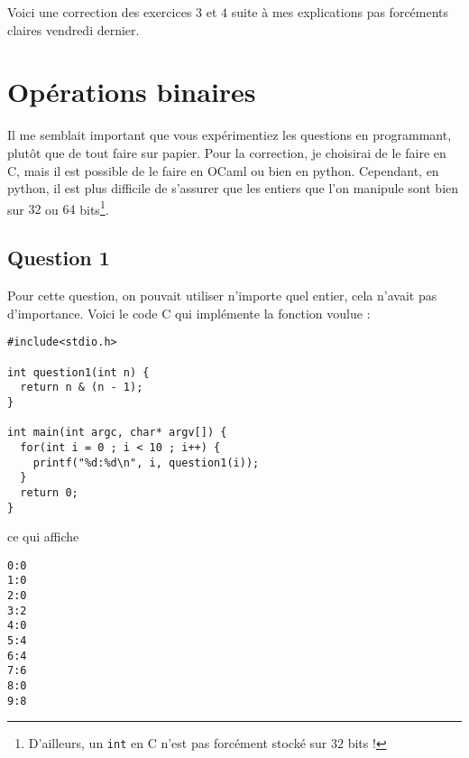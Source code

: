 \documentclass{article}
\begin{document}
Voici une correction des exercices \(3\) et \(4\) suite à mes explications pas forcéments claires vendredi dernier.

\section{Opérations binaires}

Il me semblait important que vous expérimentiez les questions en programmant, plutôt que de tout faire sur papier. Pour la correction, je choisirai de le faire en C, mais il est possible de le faire en OCaml ou bien en python. Cependant, en python, il est plus difficile de s'assurer que les entiers que l'on manipule sont bien sur \(32\) ou \(64\) bits\footnote{D'ailleurs, un \texttt{int} en C n'est pas forcément stocké sur \(32\) bits !}.

\subsection{Question 1}

Pour cette question, on pouvait utiliser n'importe quel entier, cela n'avait pas d'importance. Voici le code C qui implémente la fonction voulue :

\begin{verbatim}
#include<stdio.h>

int question1(int n) {
  return n & (n - 1);
}

int main(int argc, char* argv[]) {
  for(int i = 0 ; i < 10 ; i++) {
    printf("%d:%d\n", i, question1(i));
  }
  return 0;
}
\end{verbatim}

ce qui affiche

\begin{verbatim}
0:0
1:0
2:0
3:2
4:0
5:4
6:4
7:6
8:0
9:8
\end{verbatim}
\end{document}
